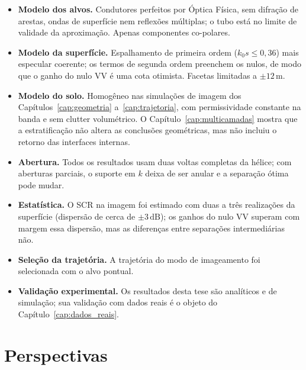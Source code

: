 \documentclass[12pt,a4paper,oneside]{book}
\theoremstyle{remark}
\newcommand{\dB}{\,\mathrm{dB}}
\theoremstyle{plain}
\theoremstyle{definition}
\begin{document}
\begin{itemize}
  \item \textbf{Modelo dos alvos.} Condutores perfeitos por Óptica Física, sem
  difração de arestas, ondas de superfície nem reflexões múltiplas; o tubo está no
  limite de validade da aproximação. Apenas componentes co-polares.
  \item \textbf{Modelo da superfície.} Espalhamento de primeira ordem
  ($k_0s\le0,36$) mais especular coerente; os termos de segunda ordem preenchem os
  nulos, de modo que o ganho do nulo VV é uma cota otimista. Facetas limitadas a
  $\pm12\,$m.
  \item \textbf{Modelo do solo.} Homogêneo nas simulações de imagem dos
  Capítulos~\ref{cap:geometria} a~\ref{cap:trajetoria}, com permissividade constante
  na banda e sem clutter volumétrico. O Capítulo~\ref{cap:multicamadas} mostra que a
  estratificação não altera as conclusões geométricas, mas não incluiu o retorno das
  interfaces internas.
  \item \textbf{Abertura.} Todos os resultados usam duas voltas completas da hélice;
  com aberturas parciais, o suporte em $k$ deixa de ser anular e a separação ótima
  pode mudar.
  \item \textbf{Estatística.} O SCR na imagem foi estimado com duas a três
  realizações da superfície (dispersão de cerca de $\pm3\dB$); os ganhos do nulo VV
  superam com margem essa dispersão, mas as diferenças entre separações
  intermediárias não.
  \item \textbf{Seleção da trajetória.} A trajetória do modo de imageamento foi
  selecionada com o alvo pontual.
  \item \textbf{Validação experimental.} Os resultados desta tese são analíticos e
  de simulação; sua validação com dados reais é o objeto do
  Capítulo~\ref{cap:dados_reais}.
\end{itemize}

\section{Perspectivas}
\label{sec:concl_fut}
\end{document}
